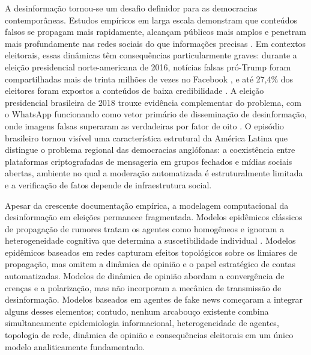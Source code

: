 \documentclass[12pt,a4paper]{article}
\theoremstyle{definition}
\theoremstyle{plain}
\begin{document}
A desinformação tornou-se um desafio definidor para as democracias contemporâneas. Estudos empíricos em larga escala demonstram que conteúdos falsos se propagam mais rapidamente, alcançam públicos mais amplos e penetram mais profundamente nas redes sociais do que informações precisas \citep{vosoughi2018spread}. Em contextos eleitorais, essas dinâmicas têm consequências particularmente graves: durante a eleição presidencial norte-americana de 2016, notícias falsas pró-Trump foram compartilhadas mais de trinta milhões de vezes no Facebook \citep{allcott2017social}, e até 27,4\% dos eleitores foram expostos a conteúdos de baixa credibilidade \citep{guess2020exposure}. A eleição presidencial brasileira de 2018 trouxe evidência complementar do problema, com o WhatsApp funcionando como vetor primário de disseminação de desinformação, onde imagens falsas superaram as verdadeiras por fator de oito \citep{machado2019whatsapp, resende2019misinformation}. O episódio brasileiro tornou visível uma característica estrutural da América Latina que distingue o problema regional das democracias anglófonas: a coexistência entre plataformas criptografadas de mensageria em grupos fechados e mídias sociais abertas, ambiente no qual a moderação automatizada é estruturalmente limitada e a verificação de fatos depende de infraestrutura social.

Apesar da crescente documentação empírica, a modelagem computacional da desinformação em eleições permanece fragmentada. Modelos epidêmicos clássicos de propagação de rumores \citep{daley1964epidemics, maki1973mathematical} tratam os agentes como homogêneos e ignoram a heterogeneidade cognitiva que determina a suscetibilidade individual \citep{pennycook2021psychology}. Modelos epidêmicos baseados em redes \citep{pastor2001epidemic, newman2002spread} capturam efeitos topológicos sobre os limiares de propagação, mas omitem a dinâmica de opinião e o papel estratégico de contas automatizadas. Modelos de dinâmica de opinião \citep{deffuant2000mixing} abordam a convergência de crenças e a polarização, mas não incorporam a mecânica de transmissão de desinformação. Modelos baseados em agentes de fake news \citep{franceschi2022agent, tornberg2018echo} começaram a integrar alguns desses elementos; contudo, nenhum arcabouço existente combina simultaneamente epidemiologia informacional, heterogeneidade de agentes, topologia de rede, dinâmica de opinião e consequências eleitorais em um único modelo analiticamente fundamentado.
\end{document}
